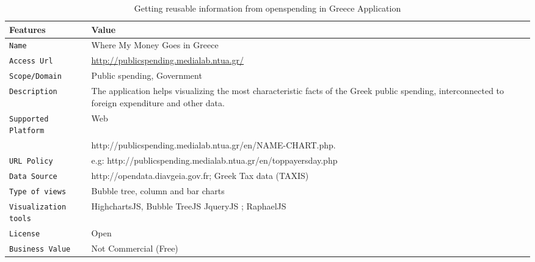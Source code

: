 \begin{table}[ht]
\centering
\begin{tabularx}{\textwidth}{ |X|X|}
\hline
\textbf{Features} & \textbf{Value} \\
\hline
\hline
\texttt{Name} & Where My Money Goes in Greece  \\ \hline
\texttt{Access Url }&	\url{http://publicspending.medialab.ntua.gr/}  \\ \hline
\texttt{Scope/Domain} &	Public spending, Government  \\ \hline
\texttt{Description} & The application helps visualizing the most characteristic facts of the Greek public spending, interconnected to foreign expenditure and other data. \\ \hline
\texttt{Supported Platform} &	Web \\ \hline
	& http://publicspending.medialab.ntua.gr/en/{NAME-CHART}.php.\\
\texttt{URL Policy}                   &  e.g:  \footnotesize{http://publicspending.medialab.ntua.gr/en/toppayersday.php} \\ \hline
\texttt{Data Source}	& http://opendata.diavgeia.gov.fr; Greek Tax data (TAXIS) \\ \hline
\texttt{Type of views} & Bubble tree, column and bar charts \\ \hline
\texttt{Visualization tools} &  HighchartsJS,  Bubble TreeJS JqueryJS ; RaphaelJS \\ \hline
\texttt{License} & Open \\ \hline
\texttt{Business Value} & Not Commercial (Free) \\ \hline


\end{tabularx}
\caption{Getting reusable information from openspending in Greece Application}
\label{tab:describeApps}
\end{table}


